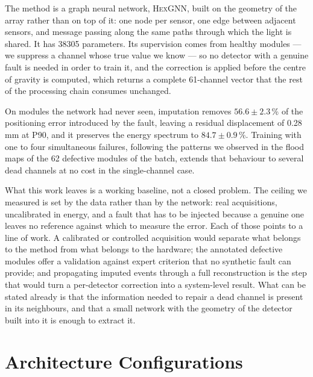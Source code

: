 \documentclass[10pt,conference]{IEEEtran}
\begin{document}
The method is a graph neural network, \textsc{HexGNN}, built on the geometry of
the array rather than on top of it: one node per sensor, one edge between
adjacent sensors, and message passing along the same paths through which the
light is shared. It has \num{38305} parameters. Its supervision comes from
healthy modules --- we suppress a channel whose true value we know --- so no
detector with a genuine fault is needed in order to train it, and the
correction is applied before the centre of gravity is computed, which returns a
complete 61-channel vector that the rest of the processing chain consumes
unchanged.

On modules the network had never seen, imputation removes $56.6 \pm 2.3$\,\% of
the positioning error introduced by the fault, leaving a residual displacement
of 0.28\,mm at P90, and it preserves the energy spectrum to
$84.7 \pm 0.9$\,\%. Training with one to four simultaneous failures, following
the patterns we observed in the flood maps of the 62 defective modules of the
batch, extends that behaviour to several dead channels at no cost in the
single-channel case.

What this work leaves is a working baseline, not a closed problem. The ceiling
we measured is set by the data rather than by the network: real acquisitions,
uncalibrated in energy, and a fault that has to be injected because a genuine
one leaves no reference against which to measure the error. Each of those
points to a line of work. A calibrated or controlled acquisition would separate
what belongs to the method from what belongs to the hardware; the annotated
defective modules offer a validation against expert criterion that no synthetic
fault can provide; and propagating imputed events through a full reconstruction
is the step that would turn a per-detector correction into a system-level
result. What can be stated already is that the information needed to repair a
dead channel is present in its neighbours, and that a small network with the
geometry of the detector built into it is enough to extract it.


\appendices

\section{Architecture Configurations}
\label{app:arch}
\end{document}
